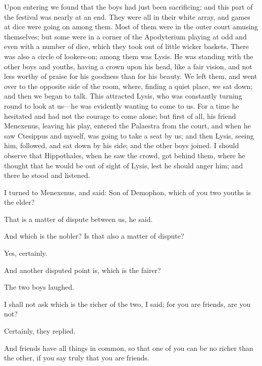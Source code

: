 \documentclass[11pt,letter]{article}
\begin{document}
\par  Upon entering we found that the boys had just been sacrificing; and this part of the festival was nearly at an end. They were all in their white array, and games at dice were going on among them. Most of them were in the outer court amusing themselves; but some were in a corner of the Apodyterium playing at odd and even with a number of dice, which they took out of little wicker baskets. There was also a circle of lookers-on; among them was Lysis. He was standing with the other boys and youths, having a crown upon his head, like a fair vision, and not less worthy of praise for his goodness than for his beauty. We left them, and went over to the opposite side of the room, where, finding a quiet place, we sat down; and then we began to talk. This attracted Lysis, who was constantly turning round to look at us—he was evidently wanting to come to us. For a time he hesitated and had not the courage to come alone; but first of all, his friend Menexenus, leaving his play, entered the Palaestra from the court, and when he saw Ctesippus and myself, was going to take a seat by us; and then Lysis, seeing him, followed, and sat down by his side; and the other boys joined. I should observe that Hippothales, when he saw the crowd, got behind them, where he thought that he would be out of sight of Lysis, lest he should anger him; and there he stood and listened.

\par  I turned to Menexenus, and said: Son of Demophon, which of you two youths is the elder?

\par  That is a matter of dispute between us, he said.

\par  And which is the nobler? Is that also a matter of dispute?

\par  Yes, certainly.

\par  And another disputed point is, which is the fairer?

\par  The two boys laughed.

\par  I shall not ask which is the richer of the two, I said; for you are friends, are you not?

\par  Certainly, they replied.

\par  And friends have all things in common, so that one of you can be no richer than the other, if you say truly that you are friends.
\end{document}

